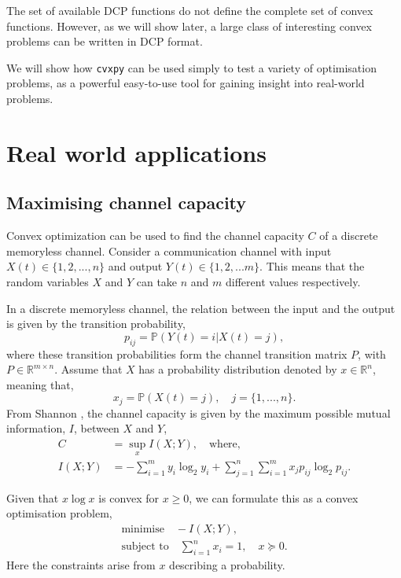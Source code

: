 \documentclass[twocolumn,secnumarabic,amssymb, nobibnotes, aps, prl,superscriptaddress]{revtex4-1}
\begin{document}
The set of available DCP functions do not define the complete set of convex functions. However, as we will show later, a large class of interesting convex problems can be written in DCP format.

We will show how \texttt{cvxpy} can be used simply to test a variety of optimisation problems, as a powerful easy-to-use tool for gaining insight into real-world problems.

\section{Real world applications}

\subsection{Maximising channel capacity}

Convex optimization can be used to find the channel capacity $C$ of a discrete memoryless channel. Consider a communication channel with input $X(t)\in\{1,2,...,n\}$ and output $Y(t)\in\{1,2,...m\}$. This means that the random variables $X$ and $Y$ can take $n$ and $m$ different values respectively.

In a discrete memoryless channel, the relation between the input and the output is given by the transition probability,
\begin{equation}
p_{ij} = \mathbb{P}(Y(t)=i|X(t)=j),
\end{equation} where these transition probabilities form the channel transition matrix $P$, with $P \in \mathbb{R}^{m\times n}$.  Assume that $X$ has a probability distribution denoted by $x\in\mathbb{R}^n$, meaning that,
\begin{equation}
x_j = \mathbb{P}(X(t) = j), \quad j=\{1,...,n\}.
\end{equation}
From Shannon \cite{shannon1949}, the channel capacity is given by the maximum possible mutual information, $I$, between $X$ and $Y$,
\begin{align}
C &= \sup_x I(X;Y), \quad \text{where},\\
I(X;Y) &= -\sum_{i=1}^{m}y_i\log_2 y_i+\sum_{j=1}^{n}\sum_{i=1}^{m}x_j p_{ij}\log_2 p_{ij}.
\end{align}

Given that $x\log x$ is convex for $x\geq 0$, we can formulate this as a convex optimisation problem,
\begin{align}
\text{minimise} \quad -I(X;Y), \\
\text{subject to} \quad \sum_{i=1}^{n}x_i = 1, \quad x \succeq 0.
\end{align} Here the constraints arise from $x$ describing a probability.
\end{document}
